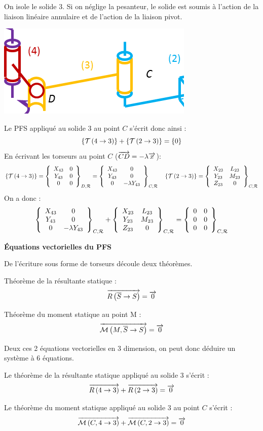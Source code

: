 \documentclass[10pt]{article}
\begin{document}
\begin{exemple}
\begin{minipage}[c]{.65\linewidth}
On isole le solide $3$. Si on néglige la pesanteur, le solide est soumis à l'action de la liaison linéaire annulaire et de l'action de la liaison pivot. 
\end{minipage}\hfill
\begin{minipage}[c]{.3\linewidth}
\begin{center}
\includegraphics[width=.8\textwidth]{images/3}
\end{center}
\end{minipage}
Le PFS appliqué au solide $3$ au point $C$ s'écrit donc ainsi : 
$$
\torseurstat{T}{4}{3} + \torseurstat{T}{2}{3} = \{0\}
$$
En écrivant les torseurs au point $C$  ($\vect{CD}=-\lambda\vect{x}$):
$$
\torseurstat{T}{4}{3}
=\torseurcol{X_{43}}{Y_{43}}{0}{0}{0}{0}{D,\mathcal{R}}
=\torseurcol{X_{43}}{Y_{43}}{0}{0}{0}{-\lambda Y_{43}}{C,\mathcal{R}}
\quad
\torseurstat{T}{2}{3}
=\torseurcol{X_{23}}{Y_{23}}{Z_{23}}{L_{23}}{M_{23}}{0}{C,\mathcal{R}}
$$
On a donc : 
$$
\torseurcol{X_{43}}{Y_{43}}{0}{0}{0}{-\lambda Y_{43}}{C,\mathcal{R}}
+ \torseurcol{X_{23}}{Y_{23}}{Z_{23}}{L_{23}}{M_{23}}{0}{C,\mathcal{R}}
= \torseurcol{0}{0}{0}{0}{0}{0}{C,\mathcal{R}}
$$
\end{exemple}


\begin{theo}
\textbf{Équations vectorielles du PFS}

De l'écriture sous forme de torseurs découle deux théorèmes.

Théorème de la résultante statique :
$$
\vectf{\overline{S}}{S}=\vect{0}
$$

Théorème du moment statique au point M :
$$
\vectm{M}{\overline{S}}{S}=\vect{0}
$$

Deux ces 2 équations vectorielles en 3 dimension, on peut donc déduire un système à 6 équations.
\end{theo}

\begin{exemple}
Le théorème de la résultante statique appliqué au solide $3$ s'écrit :
$$
\vectf{4}{3}+\vectf{2}{3}=\vect{0}
$$

Le théorème du moment statique appliqué au solide $3$ au point $C$ s'écrit :
$$
\vectm{C}{4}{3}+\vectm{C}{2}{3}=\vect{0}
$$

\end{exemple}
\end{document}
